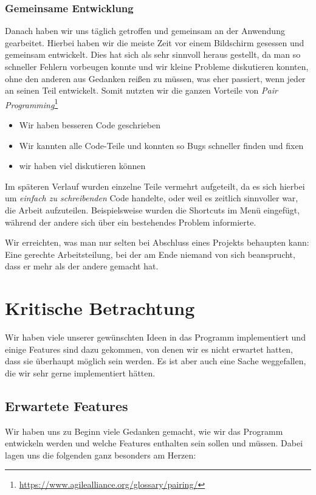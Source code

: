 \subsubsection{Gemeinsame Entwicklung}
Danach haben wir uns täglich getroffen und gemeinsam an der Anwendung gearbeitet. Hierbei haben wir die meiste Zeit vor einem Bildschirm gesessen und gemeinsam entwickelt. Dies hat sich als sehr sinnvoll heraus gestellt, da man so schneller Fehlern vorbeugen konnte und wir kleine Probleme diskutieren konnten, ohne den anderen aus Gedanken reißen zu müssen, was eher passiert, wenn jeder an seinen Teil entwickelt. Somit nutzten wir die ganzen Vorteile von \textit{Pair Programming}\footnote{\url{https://www.agilealliance.org/glossary/pairing/}}

\begin{itemize}
\item Wir haben besseren Code geschrieben
\item Wir kannten alle Code-Teile und konnten so Bugs schneller finden und fixen
\item wir haben viel diskutieren können
\end{itemize}

Im späteren Verlauf wurden einzelne Teile vermehrt aufgeteilt, da es sich hierbei um \textit{einfach zu schreibenden} Code handelte, oder weil es zeitlich sinnvoller war, die Arbeit aufzuteilen. Beispielsweise wurden die Shortcuts im Menü eingefügt, während der andere sich über ein bestehendes Problem informierte.

Wir erreichten, was man nur selten bei Abschluss eines Projekts behaupten kann: Eine gerechte Arbeitsteilung, bei der am Ende niemand von sich beansprucht, dass er mehr als der andere gemacht hat.
\section{Kritische Betrachtung}\label{sec:kritische-betrachtung}
Wir haben viele unserer gewünschten Ideen in das Programm implementiert und einige Features sind dazu gekommen, von denen wir es nicht erwartet hatten, dass sie überhaupt möglich sein werden. Es ist aber auch eine Sache weggefallen, die wir sehr gerne implementiert hätten.

\subsection{Erwartete Features}
Wir haben uns zu Beginn viele Gedanken gemacht, wie wir das Programm entwickeln werden und welche Features enthalten sein sollen und müssen. Dabei lagen uns die folgenden ganz besonders am Herzen:


